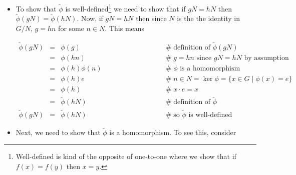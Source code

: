 \documentclass{article}
\theoremstyle{definition}
\begin{document}
\begin{itemize}
\item To show that $\widetilde{\phi}$ is
well-defined\footnote{Well-defined is kind of the opposite of
one-to-one where we show that if $f(x) = f(y)$ then $x = y$.}
we need to show that if $gN = hN$ then $\widetilde{\phi}(gN) =
\widetilde{\phi}(hN)$. Now, if $gN = hN$ then since $N$ is the
the identity in $G/N$, $g = hn$ for some $n \in N$. This means

\begin{equation*}
\begin{array}{rcll}
\widetilde{\phi}(gN)
&=& \phi(g)                                     &\hspace{8em} \mathrel{\#} \text{definition of $\widetilde{\phi}(gN)$} \\
[3pt]
&=& \phi(hn)                                    &\hspace{8em} \mathrel{\#} g = hn \text{ since } gN = hN \text{ by assumption} \\
[3pt]
&=& \phi(h)\phi(n)                              &\hspace{8em} \mathrel{\#} \text{$\phi$ is a homomorphism} \\
[3pt]
&=& \phi(h)e                                    &\hspace{8em} \mathrel{\#} n \in N = \ker \phi = \{x \in G  \mid \phi(x) = e\} \\
[3pt]
&=&  \phi(h)                                    &\hspace{8em} \mathrel{\#} x \cdot e = x \\
&=& \widetilde{\phi}(hN)                        &\hspace{8em} \mathrel{\#} \text{definition of $\widetilde{\phi}$} \\
[3pt]
\widetilde{\phi}(gN) &=& \widetilde{\phi}(hN)   &\hspace{8em} \mathrel{\#} \text{so $\widetilde{\phi}$ is well-defined}
\end{array}
\end{equation*}

\item Next, we need to show that $\widetilde{\phi}$ is a
      homomorphism. To see this, consider  


\end{itemize}
\end{document}
